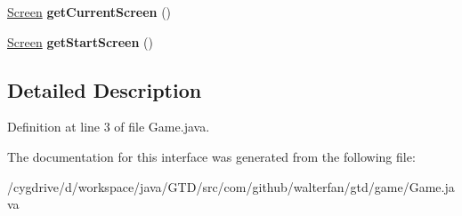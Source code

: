 \begin{DoxyCompactItemize}
\item 
\hypertarget{interfacecom_1_1github_1_1walterfan_1_1gtd_1_1game_1_1Game_ae1fb8cc40d82033e2ac888ba86dff966}{\hyperlink{classcom_1_1github_1_1walterfan_1_1gtd_1_1game_1_1Screen}{Screen} {\bfseries get\-Current\-Screen} ()}\label{interfacecom_1_1github_1_1walterfan_1_1gtd_1_1game_1_1Game_ae1fb8cc40d82033e2ac888ba86dff966}

\item 
\hypertarget{interfacecom_1_1github_1_1walterfan_1_1gtd_1_1game_1_1Game_a0ef484d6ccd07086dbedb14e0d441116}{\hyperlink{classcom_1_1github_1_1walterfan_1_1gtd_1_1game_1_1Screen}{Screen} {\bfseries get\-Start\-Screen} ()}\label{interfacecom_1_1github_1_1walterfan_1_1gtd_1_1game_1_1Game_a0ef484d6ccd07086dbedb14e0d441116}

\end{DoxyCompactItemize}


\subsection{Detailed Description}


Definition at line 3 of file Game.\-java.



The documentation for this interface was generated from the following file\-:\begin{DoxyCompactItemize}
\item 
/cygdrive/d/workspace/java/\-G\-T\-D/src/com/github/walterfan/gtd/game/Game.\-java\end{DoxyCompactItemize}
